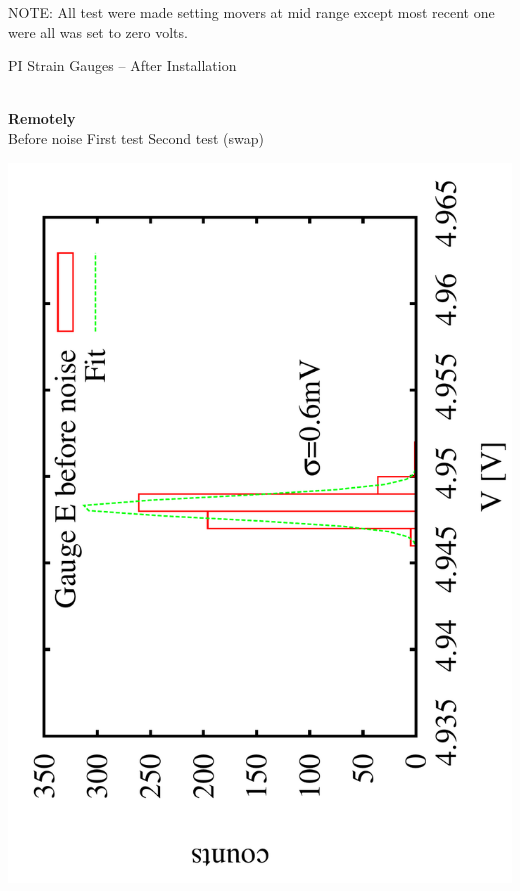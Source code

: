 \documentclass[a4paper,11pt]{book}
\begin{document}
 NOTE:
 All test were made setting movers at mid range except most recent one were all was set to zero volts.\par
PI Strain Gauges -- After Installation\par
{}\\
\hspace*{4.4cm}\textbf{Remotely}\\
\hspace*{0.8cm}Before noise \hspace{1.8cm} First test \hspace{2.0cm}Second test (swap)\par
 \includegraphics[scale=0.15,angle=-90]{image_ai_21e1.pdf}
\end{document}
